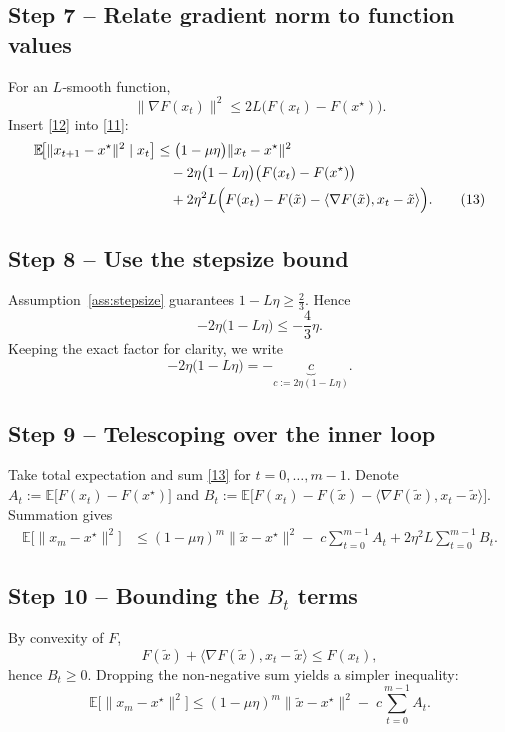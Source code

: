 \documentclass[11pt]{article}
\newcommand{\E}{\mathbb{E}}
\begin{document}
\subsection*{Step 7 – Relate gradient norm to function values}
For an $L$‑smooth function,
\[
\|\nabla F(x_t)\|^{2}\le 2L\bigl(F(x_t)-F(x^\star)\bigr). \tag{12}
\]
Insert \eqref{12} into \eqref{11}:
\[
\begin{aligned}
\E\!\bigl[\|x_{t+1}-x^\star\|^{2}\mid x_t\bigr]
&\le \bigl(1-\mu\eta\bigr)\|x_t-x^\star\|^{2}\\
&\quad -2\eta\bigl(1-L\eta\bigr)\bigl(F(x_t)-F(x^\star)\bigr)\\
&\quad +2\eta^{2}L\Bigl(F(x_t)-F(\tilde{x})-\langle\nabla F(\tilde{x}),x_t-\tilde{x}\rangle\Bigr). \tag{13}
\end{aligned}
\]

\subsection*{Step 8 – Use the stepsize bound}
Assumption~\ref{ass:stepsize} guarantees $1-L\eta\ge\frac23$. Hence
\[
-2\eta\bigl(1-L\eta\bigr)\le -\frac{4}{3}\eta .
\]
Keeping the exact factor for clarity, we write
\[
-2\eta\bigl(1-L\eta\bigr)= -\underbrace{c}_{c:=2\eta(1-L\eta)}. \tag{14}
\]

\subsection*{Step 9 – Telescoping over the inner loop}
Take total expectation and sum \eqref{13} for $t=0,\dots,m-1$.
Denote $A_t:=\E\!\bigl[F(x_t)-F(x^\star)\bigr]$ and $B_t:=\E\!\bigl[F(x_t)-F(\tilde{x})-\langle\nabla F(\tilde{x}),x_t-\tilde{x}\rangle\bigr]$.
Summation gives
\[
\begin{aligned}
\E\!\bigl[\|x_{m}-x^\star\|^{2}\bigr]
&\le (1-\mu\eta)^{m}\| \tilde{x}-x^\star\|^{2}
-\;c\sum_{t=0}^{m-1}A_t
+2\eta^{2}L\sum_{t=0}^{m-1}B_t. \tag{15}
\end{aligned}
\]

\subsection*{Step 10 – Bounding the $B_t$ terms}
By convexity of $F$,
\[
F(\tilde{x})+\langle\nabla F(\tilde{x}),x_t-\tilde{x}\rangle\le F(x_t),
\]
hence $B_t\ge 0$. Dropping the non‑negative sum yields a simpler inequality:
\[
\E\!\bigl[\|x_{m}-x^\star\|^{2}\bigr]
\le (1-\mu\eta)^{m}\| \tilde{x}-x^\star\|^{2}
-\;c\sum_{t=0}^{m-1}A_t . \tag{16}
\]
\end{document}
